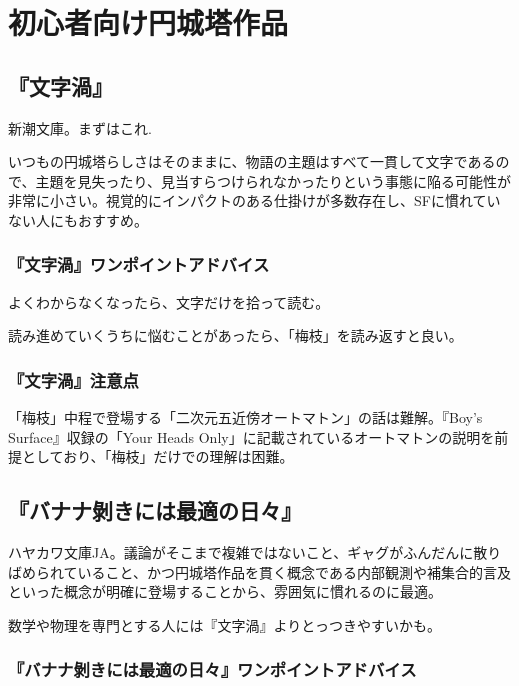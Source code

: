 \documentclass[10pt, a5paper, twoside]{jsarticle}
\begin{document}
	\section{初心者向け円城塔作品}

		\subsection{『文字渦』}
			
			新潮文庫。まずはこれ.

			いつもの円城塔らしさはそのままに、物語の主題はすべて一貫して文字であるので、主題を見失ったり、見当すらつけられなかったりという事態に陥る可能性が非常に小さい。視覚的にインパクトのある仕掛けが多数存在し、SFに慣れていない人にもおすすめ。

			\subsubsection*{『文字渦』ワンポイントアドバイス}

				よくわからなくなったら、文字だけを拾って読む。

				読み進めていくうちに悩むことがあったら、「梅枝」を読み返すと良い。

			\subsubsection*{『文字渦』注意点}

				「梅枝」中程で登場する「二次元五近傍オートマトン」の話は難解。『Boy's Surface』収録の「Your Heads Only」に記載されているオートマトンの説明を前提としており、「梅枝」だけでの理解は困難。

		\subsection{『バナナ剝きには最適の日々』}
		
			ハヤカワ文庫JA。議論がそこまで複雑ではないこと、ギャグがふんだんに散りばめられていること、かつ円城塔作品を貫く概念である内部観測や補集合的言及といった概念が明確に登場することから、雰囲気に慣れるのに最適。

			数学や物理を専門とする人には『文字渦』よりとっつきやすいかも。

			\subsubsection*{『バナナ剝きには最適の日々』ワンポイントアドバイス}
\end{document}
